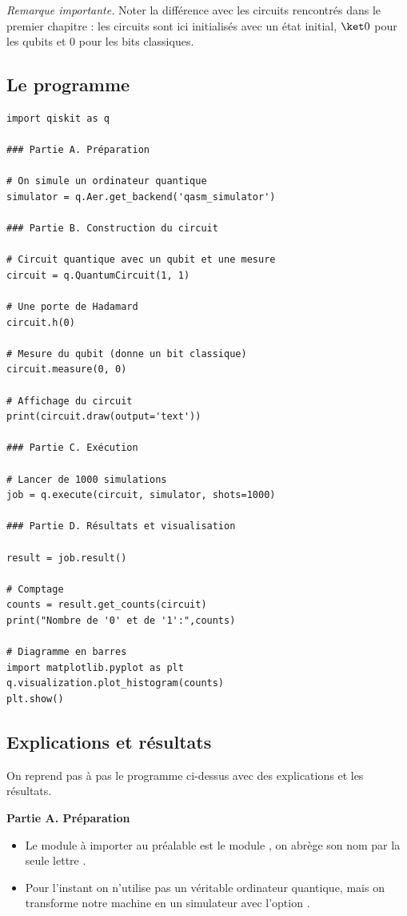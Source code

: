 \documentclass[11pt,class=report,crop=false]{standalone}
\begin{document}
\bigskip

\emph{Remarque importante.} Noter la différence avec les circuits rencontrés dans le premier chapitre :  les circuits sont ici initialisés avec un état initial,  $\ket0$ pour les qubits et $0$ pour les bits classiques.


\subsection{Le programme}

\begin{lstlisting}
import qiskit as q

### Partie A. Préparation

# On simule un ordinateur quantique
simulator = q.Aer.get_backend('qasm_simulator')

### Partie B. Construction du circuit

# Circuit quantique avec un qubit et une mesure
circuit = q.QuantumCircuit(1, 1)

# Une porte de Hadamard
circuit.h(0)

# Mesure du qubit (donne un bit classique)
circuit.measure(0, 0)

# Affichage du circuit
print(circuit.draw(output='text'))  

### Partie C. Exécution 

# Lancer de 1000 simulations
job = q.execute(circuit, simulator, shots=1000)

### Partie D. Résultats et visualisation

result = job.result()

# Comptage
counts = result.get_counts(circuit)
print("Nombre de '0' et de '1':",counts)

# Diagramme en barres
import matplotlib.pyplot as plt
q.visualization.plot_histogram(counts)
plt.show()
\end{lstlisting}

\subsection{Explications et résultats}

On reprend pas à pas le programme ci-dessus avec des explications et les résultats.

\textbf{Partie A. Préparation}

\begin{itemize}
  \item Le module \Python{} à importer au préalable est le module \qiskit{}, on abrège son nom par la seule lettre .
  \item Pour l'instant on n'utilise pas un véritable ordinateur quantique, mais on transforme notre machine en un simulateur avec l'option .
\end{itemize}
\end{document}
